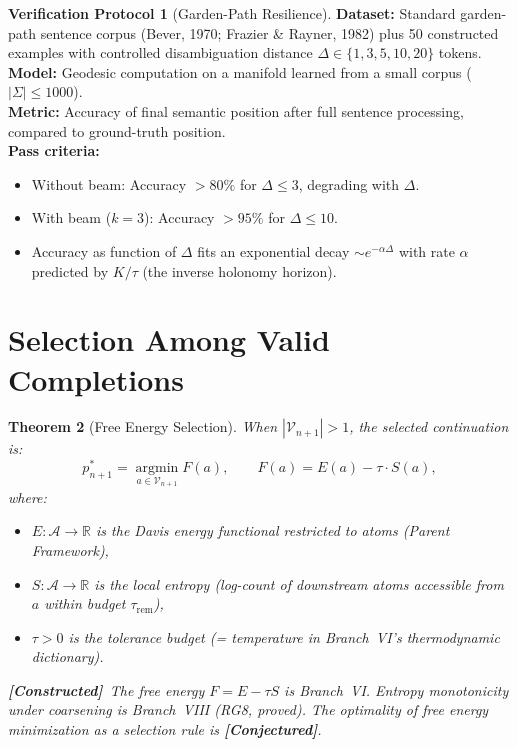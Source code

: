 \documentclass[11pt,a4paper]{article}
\newtheorem{theorem}{Theorem}[section]
\theoremstyle{definition}
\newtheorem{protocol}[theorem]{Verification Protocol}
\theoremstyle{remark}
\newcommand{\R}{\mathbb{R}}
\newcommand{\statusconstructed}{\textcolor{blue!70!black}{\textbf{[Constructed]}}}
\newcommand{\statusconjecture}{\textcolor{orange!80!black}{\textbf{[Conjectured]}}}
\begin{document}
\begin{protocol}[Garden-Path Resilience]\label{prot:garden_path}
\textbf{Dataset:} Standard garden-path sentence corpus 
(Bever, 1970; Frazier \& Rayner, 1982) plus 50 constructed 
examples with controlled disambiguation distance 
$\Delta \in \{1, 3, 5, 10, 20\}$ tokens. \\
\textbf{Model:} Geodesic computation on a manifold learned from 
a small corpus ($|\Sigma| \leq 1000$). \\
\textbf{Metric:} Accuracy of final semantic position after full 
sentence processing, compared to ground-truth position. \\
\textbf{Pass criteria:}
\begin{itemize}[nosep]
    \item Without beam: Accuracy $> 80\%$ for $\Delta \leq 3$, 
    degrading with $\Delta$.
    \item With beam ($k = 3$): Accuracy $> 95\%$ for 
    $\Delta \leq 10$.
    \item Accuracy as function of $\Delta$ fits an exponential 
    decay $\sim e^{-\alpha\Delta}$ with rate $\alpha$ 
    predicted by $K / \tau$ (the inverse holonomy horizon).
\end{itemize}
\end{protocol}


\section{Selection Among Valid Completions}\label{sec:selection}

\begin{theorem}[Free Energy Selection]\label{thm:selection}
When $|\mathcal{V}_{n+1}| > 1$, the selected continuation is:
\begin{equation}\label{eq:selection}
    p_{n+1}^* = \operatorname*{argmin}_{a \in \mathcal{V}_{n+1}} 
    F(a), \qquad F(a) = E(a) - \tau \cdot S(a),
\end{equation}
where:
\begin{itemize}[nosep]
    \item $E : \mathcal{A} \to \R$ is the Davis energy functional 
    restricted to atoms (Parent Framework),
    \item $S : \mathcal{A} \to \R$ is the local entropy 
    (log-count of downstream atoms accessible from $a$ within 
    budget $\tau_{\mathrm{rem}}$),
    \item $\tau > 0$ is the tolerance budget (= temperature in 
    Branch~VI's thermodynamic dictionary).
\end{itemize}
\statusconstructed\ The free energy $F = E - \tau S$ is 
Branch~VI. Entropy monotonicity under coarsening is Branch~VIII 
(RG8, proved). The optimality of free energy minimization as a 
selection rule is \statusconjecture.
\end{theorem}
\end{document}
